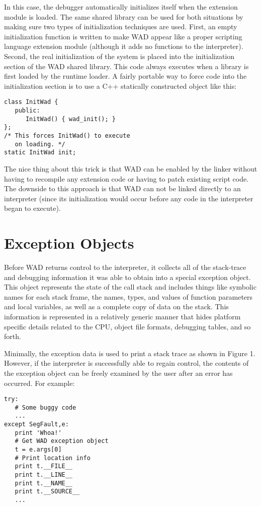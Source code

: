 In this case, the debugger automatically initializes itself when the
extension module is loaded.  The same shared library can be used for
both situations by making sure two types of initialization techniques
are used.  First, an empty initialization function is written to make
WAD appear like a proper scripting language extension module (although
it adds no functions to the interpreter).  Second, the real
initialization of the system is placed into the initialization section
of the WAD shared library.  This code always executes when a library
is first loaded by the runtime loader.  A fairly portable way to force
code into the initialization section is to use a C++ statically
constructed object like this:

\begin{verbatim}
class InitWad {
   public:
      InitWad() { wad_init(); }
};
/* This forces InitWad() to execute
   on loading. */
static InitWad init;
\end{verbatim}

The nice thing about this trick is that WAD can be enabled by the
linker without having to recompile any extension code or having to
patch existing script code.  The downside to this approach is that WAD
can not be linked directly to an interpreter (since its initialization
would occur before any code in the interpreter began to execute).

\section{Exception Objects}

Before WAD returns control to the interpreter, it collects all of the
stack-trace and debugging information it was able to obtain into a
special exception object. This object represents the state of the call
stack and includes things like symbolic names for each stack frame,
the names, types, and values of function parameters and local
variables, as well as a complete copy of data on the stack. This
information is represented in a relatively generic manner that hides
platform specific details related to the CPU, object file formats,
debugging tables, and so forth.

Minimally, the exception data is used to print a stack trace as shown
in Figure 1.  However, if the interpreter is successfully able to
regain control, the contents of the exception object can be
freely examined by the user after an error has occurred.  For example:

\begin{verbatim}
try:
   # Some buggy code
   ...
except SegFault,e:
   print 'Whoa!'
   # Get WAD exception object
   t = e.args[0]
   # Print location info
   print t.__FILE__
   print t.__LINE__
   print t.__NAME__
   print t.__SOURCE__
   ...
\end{verbatim}

